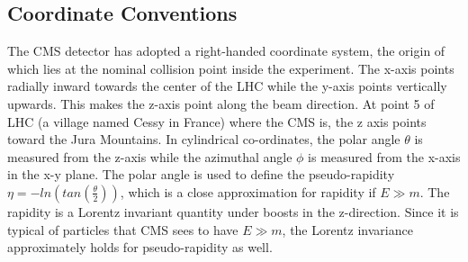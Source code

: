 \subsection{Coordinate Conventions}
\label{cor_conv}
The CMS detector has adopted a right-handed coordinate system, the origin of which lies at the nominal collision point inside the experiment. The x-axis points radially inward towards the center of the LHC while the y-axis points vertically upwards. This makes the z-axis point along the beam direction. At point 5 of LHC (a village named Cessy in France) where the CMS is, the z axis points toward the Jura Mountains. In cylindrical co-ordinates, the polar angle $\theta$ is measured from the z-axis while the azimuthal angle $\phi$ is measured from the x-axis in the x-y plane. The polar angle is used to define the pseudo-rapidity $\eta =-ln(tan(\frac{\theta}{2}))$, which is a close approximation for rapidity if $E\gg m$. The rapidity is a Lorentz invariant quantity under boosts in the z-direction. Since it is typical of particles that CMS sees to have $E\gg m$, the Lorentz invariance approximately holds for pseudo-rapidity as well. 


